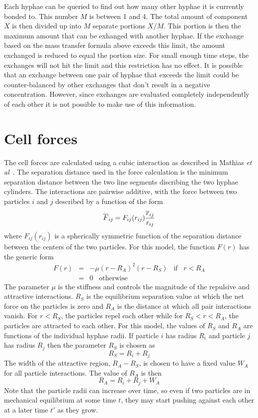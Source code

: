 \documentclass[12pt]{article}
\begin{document}
Each hyphae can be queried to find out how many other hyphae it is currently bonded to. This
number $M$ is between 1 and 4. The total amount of component $X$ is then divided up into $M$
separate portions $X/M$. This portion is then the maximum amount that can be exhanged with
another hyphae. If the exchange based on the mass transfer formula above exceeds this limit,
the amount exchanged is reduced to equal the portion size. For small enough time steps, the
exchanges will not hit the limit and this restriction has no effect. It is possible that an
exchange between one pair of hyphae that exceeds the limit could be counter-balanced by other
exchanges that don't result in a negative concentration. However, since exchanges are evaluated
completely independently of each other it is not possible to make use of this information.

\section{Cell forces}
The cell forces are calculated using a cubic interaction as described in Mathias
{\em et al}~\cite{Mathias}. The separation distance used in the force
calculation is the minimum separation distance between the two line segments
discribing the two hyphae cylinders. The interactions are pairwise
additive, with the force between two particles $i$ and $j$ described by a function of the form
\[
\overline{F}_{ij} = F_{ij}(r_{ij})\frac{\overline{r}_{ij}}{r_{ij}}
\]
where $F_{ij}(r_{ij})$ is a spherically symmetric function of the separation distance between the
centers of the two particles. For this model, the function $F(r)$ has the generic form
\begin{eqnarray*}
F(r) &=& -\mu(r-R_A)^2(r-R_S)\;\;\;\mbox{if}\;\;\;r<R_A \\
& = & 0\;\;\; \mbox{otherwise}
\end{eqnarray*}
The parameter $\mu$ is the stiffness and controls the magnitude of the repulsive and attractive
interactions. $R_S$ is the equilibrium separation value at which the net force on the particles is zero
and $R_A$ is the distance at which all pair interactions vanish. For $r<R_S$, the particles repel each
other while for $R_S<r<R_A$, the particles are attracted to each other. For this model, the values of
$R_S$ and $R_A$ are functions of the individual hyphae radii. If particle $i$ has radius $R_i$ and
particle $j$ has radius $R_j$ then the parameter $R_S$ is chosen as
\[
R_S = R_i+R_j
\]
The width of the attractive region, $R_A-R_S$, is chosen to have a fixed value $W_A$ for all particle
interactions. The value of $R_A$ is then
\[
R_A = R_i+R_j +W_A
\]
Note that the particle radii can increase over time, so even if two particles are in mechanical
equilibrium at some time $t$, they may start pushing against each other at a later time $t'$ as they
grow.
\end{document}
